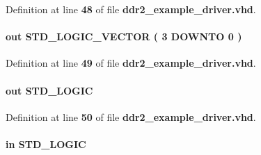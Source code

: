 Definition at line {\bf 48} of file {\bf ddr2\+\_\+example\+\_\+driver.\+vhd}.

\paragraph[{pnf\+\_\+per\+\_\+byte}]{ {\bfseries \textcolor{keywordflow}{out}\textcolor{vhdlchar}{ }} {\bfseries \textcolor{comment}{S\+T\+D\+\_\+\+L\+O\+G\+I\+C\+\_\+\+V\+E\+C\+T\+OR}\textcolor{vhdlchar}{ }\textcolor{vhdlchar}{(}\textcolor{vhdlchar}{ }\textcolor{vhdlchar}{ } \textcolor{vhdldigit}{3} \textcolor{vhdlchar}{ }\textcolor{keywordflow}{D\+O\+W\+N\+TO}\textcolor{vhdlchar}{ }\textcolor{vhdlchar}{ } \textcolor{vhdldigit}{0} \textcolor{vhdlchar}{ }\textcolor{vhdlchar}{)}\textcolor{vhdlchar}{ }} \hspace{0.3cm}{\ttfamily [Port]}}\label{classddr2__example__driver_ae9516037e54a409f850c9409abb43ae2}


Definition at line {\bf 49} of file {\bf ddr2\+\_\+example\+\_\+driver.\+vhd}.

\paragraph[{pnf\+\_\+persist}]{ {\bfseries \textcolor{keywordflow}{out}\textcolor{vhdlchar}{ }} {\bfseries \textcolor{comment}{S\+T\+D\+\_\+\+L\+O\+G\+IC}\textcolor{vhdlchar}{ }} \hspace{0.3cm}{\ttfamily [Port]}}\label{classddr2__example__driver_af605a5af9fe81e049d4f46f18761d8f5}


Definition at line {\bf 50} of file {\bf ddr2\+\_\+example\+\_\+driver.\+vhd}.

\paragraph[{reset\+\_\+n}]{ {\bfseries \textcolor{keywordflow}{in}\textcolor{vhdlchar}{ }} {\bfseries \textcolor{comment}{S\+T\+D\+\_\+\+L\+O\+G\+IC}\textcolor{vhdlchar}{ }} \hspace{0.3cm}{\ttfamily [Port]}}\label{classddr2__example__driver_a8881084de0fcf748e41bd0fd1028445e}


